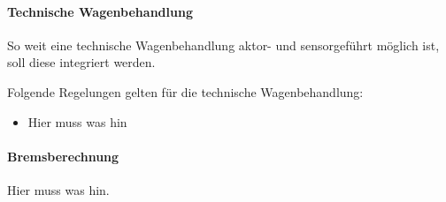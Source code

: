 \paragraph{Technische Wagenbehandlung}
\begin{feat}
So weit eine technische Wagenbehandlung aktor- und sensorgeführt möglich ist, soll diese integriert werden.
\end{feat}
\begin{feat}
Folgende Regelungen gelten für die technische Wagenbehandlung:
\begin{itemize}
    \item Hier muss was hin
\end{itemize}
\end{feat}

\paragraph{Bremsberechnung}
Hier muss was hin.

